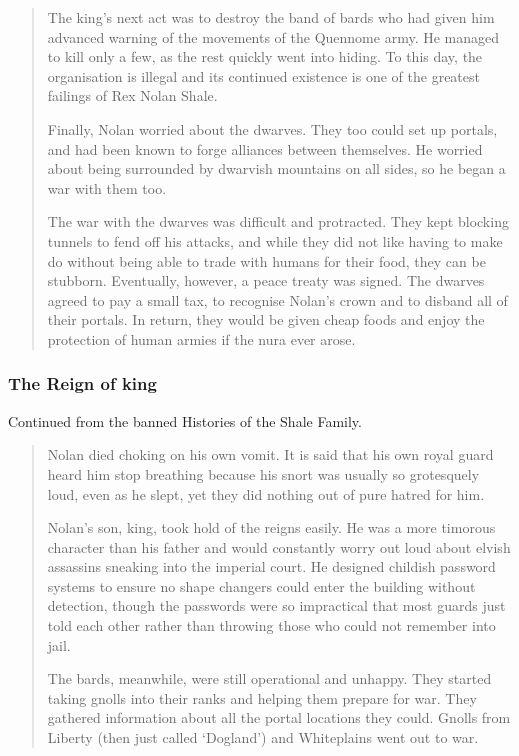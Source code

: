 \begin{multicols}{2}
\begin{quotation}
  The king's next act was to destroy the band of bards who had given him advanced warning of the movements of the Quennome army.
  He managed to kill only a few, as the rest quickly went into hiding.
  To this day, the organisation is illegal and its continued existence is one of the greatest failings of Rex Nolan Shale.

  Finally, Nolan worried about the dwarves.
  They too could set up portals, and had been known to forge alliances between themselves.
  He worried about being surrounded by dwarvish mountains on all sides, so he began a war with them too.

  The war with the dwarves was difficult and protracted.
  They kept blocking tunnels to fend off his attacks, and while they did not like having to make do without being able to trade with humans for their food, they can be stubborn.
  Eventually, however, a peace treaty was signed.
  The dwarves agreed to pay a small tax, to recognise Nolan's crown and to disband all of their portals.
  In return, they would be given cheap foods and enjoy the protection of human armies if the nura ever arose.

\end{quotation}

\subsubsection{The Reign of \gls{king}}

Continued from the banned Histories of the Shale Family.

\begin{quotation}

  Nolan died choking on his own vomit.
  It is said that his own royal guard heard him stop breathing because his snort was usually so grotesquely loud, even as he slept, yet they did nothing out of pure hatred for him.

  Nolan's son, \gls{king}, took hold of the reigns easily.
  He was a more timorous character than his father and would constantly worry out loud about elvish assassins sneaking into the imperial court.
  He designed childish password systems to ensure no shape changers could enter the building without detection, though the passwords were so impractical that most guards just told each other rather than throwing those who could not remember into jail.

  The bards, meanwhile, were still operational and unhappy.
  They started taking gnolls into their ranks and helping them prepare for war.
  They gathered information about all the portal locations they could.
  Gnolls from Liberty (then just called `Dogland') and Whiteplains went out to war.


\end{quotation}
\end{multicols}
